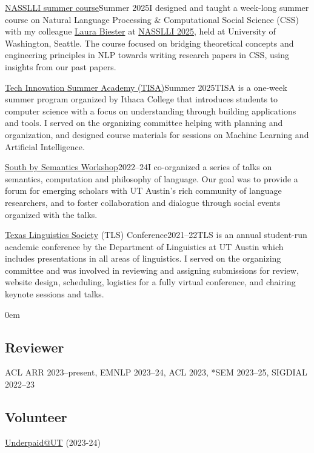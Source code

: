 \smallentry
  {\large \href{https://nasslli25-nlp-css.github.io}{NASSLLI summer course}}{\large Summer 2025}{I designed and taught a week-long summer course on Natural Language Processing \& Computational Social Science (CSS) with my colleague \href{https://www.laurabiester.com}{Laura Biester} at \href{https://nasslli25.shane.st}{NASSLLI 2025}, held at University of Washington, Seattle. The course focused on bridging theoretical concepts and engineering principles in NLP towards writing research papers in CSS, using insights from our past papers.}

\smallentry
  {\large \href{https://www.ithaca.edu/tech-innovation-summer-academy}{Tech Innovation Summer Academy (TISA)}}{\large Summer 2025}{TISA is a one-week summer program organized by Ithaca College that introduces students to computer science with a focus on understanding through building applications and tools. I served on the organizing committee helping with planning and organization, and designed course materials for sessions on Machine Learning and Artificial Intelligence.}

\smallentry
  {\large \href{https://sites.google.com/utexas.edu/sxsw/archive}{South by Semantics Workshop}}{\large 2022--24}{I co-organized a series of talks on semantics, computation and philosophy of language. Our goal was to provide a forum for emerging scholars with UT Austin's rich community of language researchers, and to foster collaboration and dialogue through social events organized with the talks.}
  
\smallentry
    {\large \href{http://tls.ling.utexas.edu/}{Texas Linguistics Society} (TLS) Conference}{\large 2021--22}{TLS is an annual student-run academic conference by the Department of Linguistics at UT Austin which includes presentations in all areas of linguistics. I served on the organizing committee and was involved in reviewing and assigning submissions for review, website design, scheduling, logistics for a fully virtual conference, and chairing keynote sessions and talks.}

\leftskip0em\relax

\subsection{Reviewer}

\quad ACL ARR 2023--present, EMNLP 2023--24, ACL 2023, *SEM 2023--25, SIGDIAL 2022--23

\subsection{Volunteer}

\quad \href{http://underpaidatut.org}{Underpaid\makeatletter @\makeatother UT} (2023-24)
